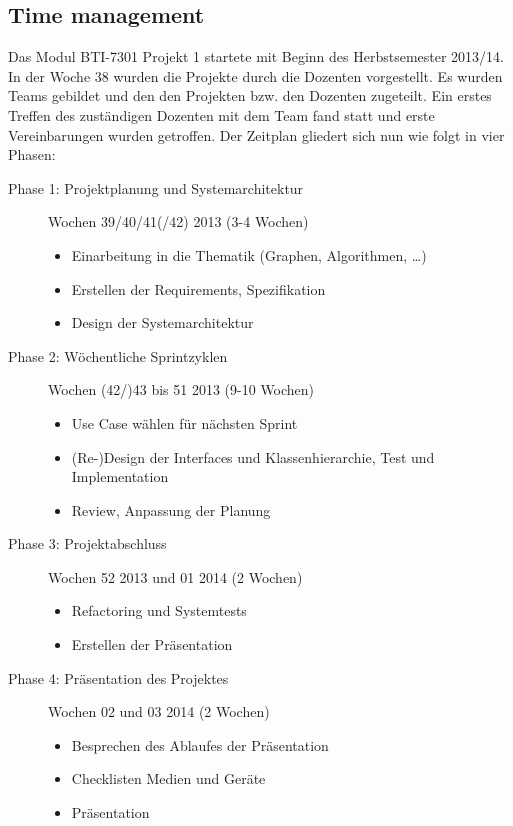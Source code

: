\subsection{Time management}
\label{subsec:Time management}
Das Modul BTI-7301 Projekt 1 startete mit Beginn des Herbstsemester 2013/14. In der Woche 38 wurden die Projekte durch die Dozenten vorgestellt. Es wurden Teams gebildet und den den Projekten bzw. den Dozenten zugeteilt. Ein erstes Treffen des zust\"andigen Dozenten mit dem Team fand statt und erste Vereinbarungen wurden getroffen. Der Zeitplan gliedert sich nun wie folgt in vier Phasen:
\begin{description}
  \item[Phase 1: Projektplanung und Systemarchitektur] Wochen 39/40/41(/42) 2013 (3-4 Wochen)
  \begin{itemize}
    \item Einarbeitung in die Thematik (Graphen, Algorithmen, \dots)
    \item Erstellen der Requirements, Spezifikation
    \item Design der Systemarchitektur
  \end{itemize}
  \item[Phase 2: W\"ochentliche Sprintzyklen] Wochen (42/)43 bis 51 2013 (9-10 Wochen)
  \begin{itemize}
    \item Use Case w\"ahlen f\"ur n\"achsten Sprint
    \item (Re-)Design der Interfaces und Klassenhierarchie, Test und Implementation
    \item Review, Anpassung der Planung
  \end{itemize}
  \item[Phase 3: Projektabschluss] Wochen 52 2013 und 01 2014 (2 Wochen)
  \begin{itemize}
    \item Refactoring und Systemtests
    \item Erstellen der Pr\"asentation
  \end{itemize}
  \item[Phase 4: Pr\"asentation des Projektes] Wochen 02 und 03 2014 (2 Wochen)
  \begin{itemize}
    \item Besprechen des Ablaufes der Pr\"asentation
    \item Checklisten Medien und Ger\"ate
    \item Pr\"asentation
  \end{itemize}
\end{description}
% 
\newpage
